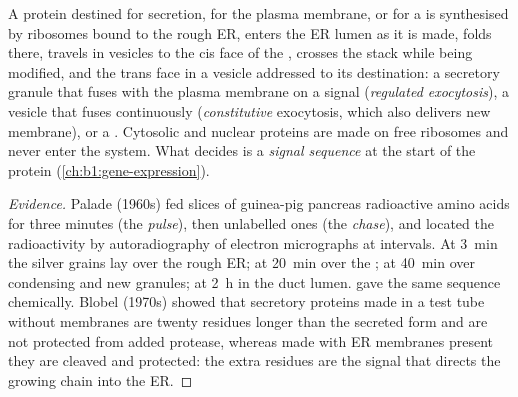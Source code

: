 \begin{proposition}\label{prop:b1:eukaryotic-cell:secretory}
A protein destined for secretion, for the plasma membrane, or for a
 is synthesised by ribosomes bound to the rough ER, enters the
ER lumen as it is made, folds there, travels in vesicles to the cis
face of the , crosses the stack while being modified, and 
the trans face in a vesicle addressed to its destination: a secretory
granule that fuses with the plasma membrane on a signal
(\emph{regulated exocytosis}), a vesicle that fuses
continuously (\emph{constitutive} exocytosis, which also delivers new
membrane), or a . Cytosolic and nuclear proteins are made on
free ribosomes and never enter the system. What decides is a
\emph{signal sequence} at the start of the
protein (\cref{ch:b1:gene-expression}).
\end{proposition}
\begin{proof}[Evidence]
Palade (1960s) fed slices of guinea-pig pancreas radioactive amino
acids for three minutes (the \emph{pulse}), then unlabelled ones (the
\emph{chase}), and located the radioactivity by autoradiography of
electron micrographs at intervals. At \qty{3}{min} the silver grains
lay over the rough ER; at \qty{20}{min} over the ; at \qty{40}{min}
over condensing  and new granules; at \qty{2}{h} in the duct
lumen.  gave the same sequence chemically. Blobel
(1970s) showed that secretory proteins made in a test tube without
membranes are twenty residues longer than the secreted form and are not
protected from added protease, whereas made with ER membranes present
they are cleaved and protected: the extra residues are the signal that
directs the growing chain into the ER.
\end{proof}

